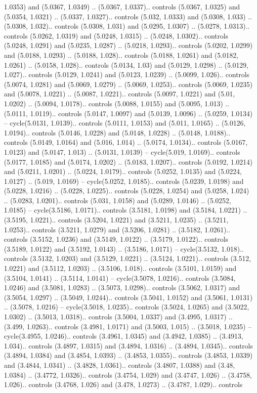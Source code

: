 1.0353) and (5.0367, 1.0349) .. (5.0367, 1.0337).. controls (5.0367, 1.0325) and (5.0354, 1.0321) .. (5.0337, 1.0327).. controls (5.032, 1.0333) and (5.0308, 1.033) .. (5.0308, 1.032).. controls (5.0308, 1.031) and (5.0295, 1.0307) .. (5.0278, 1.0313).. controls (5.0262, 1.0319) and (5.0248, 1.0315) .. (5.0248, 1.0302).. controls (5.0248, 1.0291) and (5.0235, 1.0287) .. (5.0218, 1.0293).. controls (5.0202, 1.0299) and (5.0188, 1.0293) .. (5.0188, 1.028).. controls (5.0188, 1.0261) and (5.0182, 1.0261) .. (5.0158, 1.028).. controls (5.0134, 1.03) and (5.0129, 1.0298) .. (5.0129, 1.027).. controls (5.0129, 1.0241) and (5.0123, 1.0239) .. (5.0099, 1.026).. controls (5.0074, 1.0281) and (5.0069, 1.0279) .. (5.0069, 1.0253).. controls (5.0069, 1.0235) and (5.0078, 1.0221) .. (5.0087, 1.0221).. controls (5.0097, 1.0221) and (5.01, 1.0202) .. (5.0094, 1.0178).. controls (5.0088, 1.0155) and (5.0095, 1.013) .. (5.0111, 1.0119).. controls (5.0147, 1.0097) and (5.0139, 1.0096) .. (5.0259, 1.0134) -- cycle(5.0131, 1.0139).. controls (5.0111, 1.0153) and (5.011, 1.0165) .. (5.0126, 1.0194).. controls (5.0146, 1.0228) and (5.0148, 1.0228) .. (5.0148, 1.0188).. controls (5.0149, 1.0164) and (5.016, 1.014) .. (5.0174, 1.0134).. controls (5.0167, 1.0123) and (5.0147, 1.013) .. (5.0131, 1.0139) -- cycle(5.019, 1.0169).. controls (5.0177, 1.0185) and (5.0174, 1.0202) .. (5.0183, 1.0207).. controls (5.0192, 1.0214) and (5.0211, 1.0201) .. (5.0224, 1.0179).. controls (5.0252, 1.0135) and (5.0224, 1.0127) .. (5.019, 1.0169) -- cycle(5.0252, 1.0185).. controls (5.0239, 1.0198) and (5.0228, 1.0216) .. (5.0228, 1.0225).. controls (5.0228, 1.0254) and (5.0258, 1.024) .. (5.0283, 1.0201).. controls (5.031, 1.0158) and (5.0289, 1.0146) .. (5.0252, 1.0185) -- cycle(3.5186, 1.0171).. controls (3.5181, 1.0198) and (3.5184, 1.0221) .. (3.5195, 1.0221).. controls (3.5204, 1.0221) and (3.5211, 1.0235) .. (3.5211, 1.0253).. controls (3.5211, 1.0279) and (3.5206, 1.0281) .. (3.5182, 1.0261).. controls (3.5152, 1.0236) and (3.5149, 1.0122) .. (3.5179, 1.0122).. controls (3.5189, 1.0122) and (3.5192, 1.0143) .. (3.5186, 1.0171) -- cycle(3.5132, 1.018).. controls (3.5132, 1.0203) and (3.5129, 1.0221) .. (3.5124, 1.0221).. controls (3.512, 1.0221) and (3.5112, 1.0203) .. (3.5106, 1.018).. controls (3.5101, 1.0159) and (3.5104, 1.0141) .. (3.5114, 1.0141) -- cycle(3.5078, 1.0216).. controls (3.5084, 1.0246) and (3.5081, 1.0283) .. (3.5073, 1.0298).. controls (3.5062, 1.0317) and (3.5054, 1.0297) .. (3.5049, 1.0244).. controls (3.5041, 1.0152) and (3.5061, 1.0131) .. (3.5078, 1.0216) -- cycle(3.5018, 1.0235).. controls (3.5024, 1.0265) and (3.5022, 1.0302) .. (3.5013, 1.0318).. controls (3.5004, 1.0337) and (3.4995, 1.0317) .. (3.499, 1.0263).. controls (3.4981, 1.0171) and (3.5003, 1.015) .. (3.5018, 1.0235) -- cycle(3.4955, 1.0246).. controls (3.4961, 1.0345) and (3.4942, 1.0385) .. (3.4913, 1.034).. controls (3.4897, 1.0315) and (3.4894, 1.0316) .. (3.4894, 1.0345).. controls (3.4894, 1.0384) and (3.4854, 1.0393) .. (3.4853, 1.0355).. controls (3.4853, 1.0339) and (3.4844, 1.0341) .. (3.4828, 1.0361).. controls (3.4807, 1.0388) and (3.48, 1.0384) .. (3.4772, 1.0326).. controls (3.4754, 1.029) and (3.4747, 1.026) .. (3.4758, 1.026).. controls (3.4768, 1.026) and (3.478, 1.0273) .. (3.4787, 1.029).. controls 